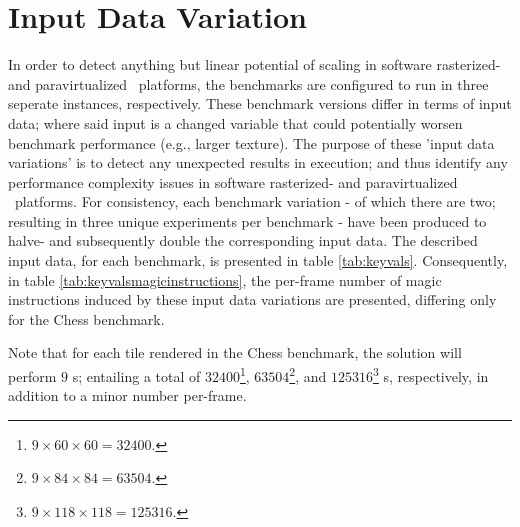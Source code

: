 \section{Input Data Variation}
\label{sec:experimentalmethodology_inputdatavariation}
In order to detect anything but linear potential of scaling in software rasterized- and paravirtualized \dvttermsimics\ platforms, the benchmarks are configured to run in three seperate instances, respectively.
These benchmark versions differ in terms of input data; where said input is a changed variable that could potentially worsen benchmark performance (e.g., larger texture).
The purpose of these 'input data variations' is to detect any unexpected results in execution; and thus identify any performance complexity issues in software rasterized- and paravirtualized \dvttermsimics\ platforms.
For consistency, each benchmark variation - of which there are two; resulting in three unique experiments per benchmark - have been produced to halve- and subsequently double the corresponding input data.
The described input data, for each benchmark, is presented in table \ref{tab:keyvals}.
Consequently, in table \ref{tab:keyvalsmagicinstructions}, the per-frame number of magic instructions induced by these input data variations are presented, differing only for the Chess benchmark.





Note that for each tile rendered in the Chess benchmark, the solution will perform $9$ \dvttermmagicinstruction s; entailing a total of $32400$\footnote{$9\times60\times60=32400$.}, $63504$\footnote{$9\times84\times84=63504$.}, and $125316$\footnote{$9\times118\times118=125316$.} \dvttermmagicinstruction s, respectively, in addition to a minor number per-frame.
